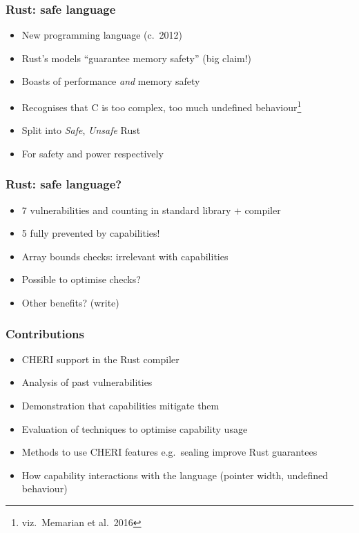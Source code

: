 \documentclass{beamer}
\begin{document}
\begin{frame}
\frametitle{Rust: safe language}

\begin{itemize}
    \item New programming language (c.\ 2012)
    \item Rust's models ``guarantee memory safety'' (big claim!)
    \item Boasts of performance \emph{and} memory safety
    \item Recognises that C is too complex, too much undefined behaviour\footnote{viz.\ Memarian et al.\ 2016}
    \item Split into \emph{Safe}, \emph{Unsafe} Rust
    \item For safety and power respectively
\end{itemize}
\end{frame}


\begin{frame}
\frametitle{Rust: safe language?}

\begin{itemize}
    \item 7 vulnerabilities and counting in standard library + compiler
    \item 5 fully prevented by capabilities!
    \item Array bounds checks: irrelevant with capabilities
    \item Possible to optimise checks?
    \item Other benefits? (write)
\end{itemize}
\end{frame}


\begin{frame}
\frametitle{Contributions}

\begin{itemize}
    \item CHERI support in the Rust compiler
    \item Analysis of past vulnerabilities
    \item Demonstration that capabilities mitigate them
    \item Evaluation of techniques to optimise capability usage
    \item Methods to use CHERI features e.g.\ sealing improve Rust guarantees
    \item How capability interactions with the language (pointer width,
    undefined behaviour)
\end{itemize}
\end{frame}
\end{document}
